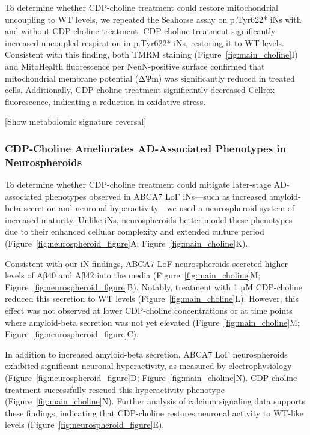 To determine whether CDP-choline treatment could restore mitochondrial uncoupling to WT levels, we repeated the Seahorse assay on p.Tyr622* iNs with and without CDP-choline treatment. CDP-choline treatment significantly increased uncoupled respiration in p.Tyr622* iNs, restoring it to WT levels. Consistent with this finding, both TMRM staining (Figure~\ref{fig:main_choline}I) and MitoHealth fluorescence per NeuN-positive surface confirmed that mitochondrial membrane potential (ΔѰm) was significantly reduced in treated cells. Additionally, CDP-choline treatment significantly decreased Cellrox fluorescence, indicating a reduction in oxidative stress. 

[Show metabolomic signature reversal]

\subsubsection{CDP-Choline Ameliorates AD-Associated Phenotypes in Neurospheroids}
To determine whether CDP-choline treatment could mitigate later-stage AD-associated phenotypes observed in ABCA7 LoF iNs—such as increased amyloid-beta secretion and neuronal hyperactivity—we used a neurospheroid system of increased maturity. Unlike iNs, neurospheroids better model these phenotypes due to their enhanced cellular complexity and extended culture period (Figure~\ref{fig:neurospheroid_figure}A; Figure~\ref{fig:main_choline}K).

Consistent with our iN findings, ABCA7 LoF neurospheroids secreted higher levels of Aβ40 and Aβ42 into the media (Figure~\ref{fig:main_choline}M; Figure~\ref{fig:neurospheroid_figure}B). Notably, treatment with 1 µM CDP-choline reduced this secretion to WT levels (Figure~\ref{fig:main_choline}L). However, this effect was not observed at lower CDP-choline concentrations or at time points where amyloid-beta secretion was not yet elevated (Figure~\ref{fig:main_choline}M; Figure~\ref{fig:neurospheroid_figure}C).

In addition to increased amyloid-beta secretion, ABCA7 LoF neurospheroids exhibited significant neuronal hyperactivity, as measured by electrophysiology (Figure~\ref{fig:neurospheroid_figure}D; Figure~\ref{fig:main_choline}N). CDP-choline treatment successfully rescued this hyperactivity phenotype (Figure~\ref{fig:main_choline}N). Further analysis of calcium signaling data supports these findings, indicating that CDP-choline restores neuronal activity to WT-like levels (Figure~\ref{fig:neurospheroid_figure}E).

